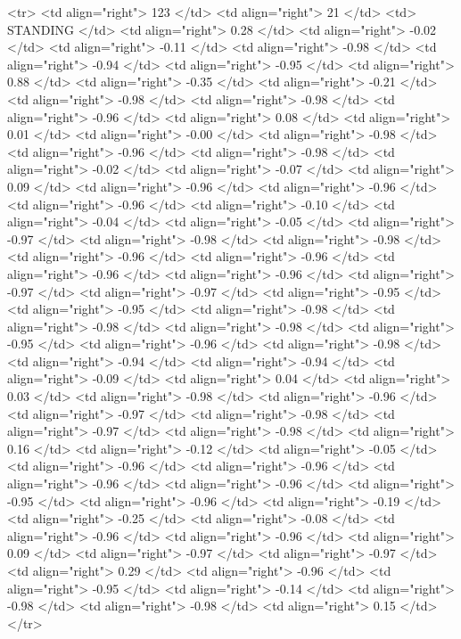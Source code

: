  <tr> <td align="right"> 123 </td> <td align="right">  21 </td> <td> STANDING </td> <td align="right"> 0.28 </td> <td align="right"> -0.02 </td> <td align="right"> -0.11 </td> <td align="right"> -0.98 </td> <td align="right"> -0.94 </td> <td align="right"> -0.95 </td> <td align="right"> 0.88 </td> <td align="right"> -0.35 </td> <td align="right"> -0.21 </td> <td align="right"> -0.98 </td> <td align="right"> -0.98 </td> <td align="right"> -0.96 </td> <td align="right"> 0.08 </td> <td align="right"> 0.01 </td> <td align="right"> -0.00 </td> <td align="right"> -0.98 </td> <td align="right"> -0.96 </td> <td align="right"> -0.98 </td> <td align="right"> -0.02 </td> <td align="right"> -0.07 </td> <td align="right"> 0.09 </td> <td align="right"> -0.96 </td> <td align="right"> -0.96 </td> <td align="right"> -0.96 </td> <td align="right"> -0.10 </td> <td align="right"> -0.04 </td> <td align="right"> -0.05 </td> <td align="right"> -0.97 </td> <td align="right"> -0.98 </td> <td align="right"> -0.98 </td> <td align="right"> -0.96 </td> <td align="right"> -0.96 </td> <td align="right"> -0.96 </td> <td align="right"> -0.96 </td> <td align="right"> -0.97 </td> <td align="right"> -0.97 </td> <td align="right"> -0.95 </td> <td align="right"> -0.95 </td> <td align="right"> -0.98 </td> <td align="right"> -0.98 </td> <td align="right"> -0.98 </td> <td align="right"> -0.95 </td> <td align="right"> -0.96 </td> <td align="right"> -0.98 </td> <td align="right"> -0.94 </td> <td align="right"> -0.94 </td> <td align="right"> -0.09 </td> <td align="right"> 0.04 </td> <td align="right"> 0.03 </td> <td align="right"> -0.98 </td> <td align="right"> -0.96 </td> <td align="right"> -0.97 </td> <td align="right"> -0.98 </td> <td align="right"> -0.97 </td> <td align="right"> -0.98 </td> <td align="right"> 0.16 </td> <td align="right"> -0.12 </td> <td align="right"> -0.05 </td> <td align="right"> -0.96 </td> <td align="right"> -0.96 </td> <td align="right"> -0.96 </td> <td align="right"> -0.96 </td> <td align="right"> -0.95 </td> <td align="right"> -0.96 </td> <td align="right"> -0.19 </td> <td align="right"> -0.25 </td> <td align="right"> -0.08 </td> <td align="right"> -0.96 </td> <td align="right"> -0.96 </td> <td align="right"> 0.09 </td> <td align="right"> -0.97 </td> <td align="right"> -0.97 </td> <td align="right"> 0.29 </td> <td align="right"> -0.96 </td> <td align="right"> -0.95 </td> <td align="right"> -0.14 </td> <td align="right"> -0.98 </td> <td align="right"> -0.98 </td> <td align="right"> 0.15 </td> </tr>

